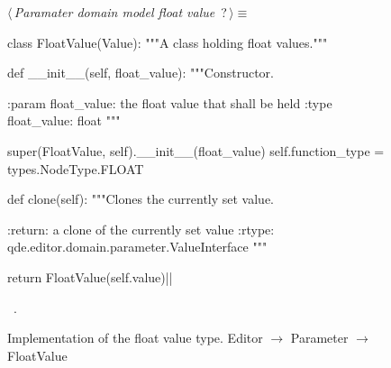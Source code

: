 \documentclass[%
    a4paper,    %
    justified,  %
    nobib,      %
    openany     %
]{tufte-book}
\begin{document}
\begin{figure}
\begin{flushleft} \small
\begin{minipage}{\linewidth}\label{scrap132}\raggedright\small
{} $\langle\,${\itshape Paramater domain model float value}\nobreak\ {\footnotesize {?}}$\,\rangle\equiv$
\vspace{-1ex}
\begin{pythoncode}
class FloatValue(Value):
    """A class holding float values."""

    def __init__(self, float_value):
        """Constructor.

        :param float_value: the float value that shall be held
        :type  float_value: float
        """

        super(FloatValue, self).__init__(float_value)
        self.function_type = types.NodeType.FLOAT

    def clone(self):
        """Clones the currently set value.

        :return: a clone of the currently set value
        :rtype:  qde.editor.domain.parameter.ValueInterface
        """

        return FloatValue(self.value)|\NWsep|
\end{pythoncode}
\vspace{1.5ex}
\footnotesize
\begin{list}{}{\setlength{\itemsep}{-\parsep}\setlength{\itemindent}{-\leftmargin}}
\item \NWtxtMacroRefIn\ .

\item{}
\end{list}
\end{minipage}\vspace{4ex}
\end{flushleft}
\caption{Implementation of the float value type.
  \newline{}\newline{}Editor $\rightarrow$ Parameter $\rightarrow$
  FloatValue}
\label{editor:lst:parameter:float-value}
\end{figure}
\end{document}
